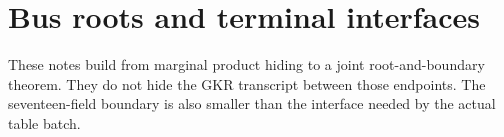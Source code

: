 \section{Bus roots and terminal interfaces}\label{sec:bus}

These notes build from marginal product hiding to a joint root-and-boundary theorem. They do not hide the GKR transcript between those endpoints. The seventeen-field boundary is also smaller than the interface needed by the actual table batch.







